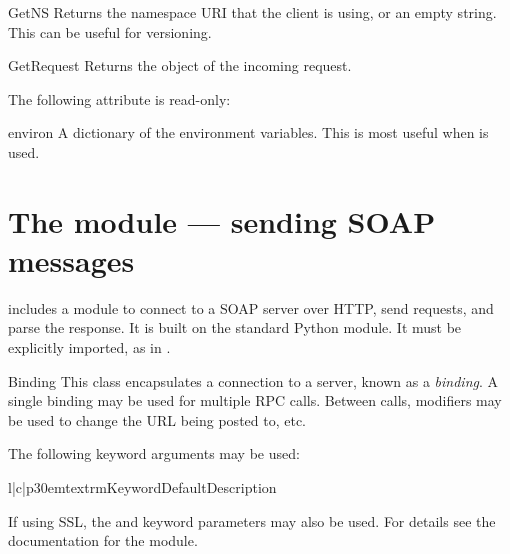 \begin{methoddesc}{GetNS}{}
Returns the namespace URI that the client is using, or an empty string.
This can be useful for versioning.
\end{methoddesc}

\begin{methoddesc}{GetRequest}{}
Returns the  object of the incoming request.
\end{methoddesc}

The following attribute is read-only:

\begin{memberdesc}{environ}
A dictionary of the environment variables.
This is most useful when  is used.
\end{memberdesc}

\section{The  module --- sending SOAP messages}

\ZSI{} includes a module to connect to a SOAP server over HTTP, send requests,
and parse the response.
It is built on the standard Python  module.
It must be explicitly imported, as in
.

\begin{classdesc}{Binding}{}
This class encapsulates a connection to a server, known as a \emph{binding}.
A single binding may be used for multiple RPC calls.
Between calls, modifiers may be used to change the URL being posted to,
etc.

The following keyword arguments may be used:

\begin{tableiii}{l|c|p{30em}}{textrm}{Keyword}{Default}{Description}
\end{tableiii}

If using SSL, the  and  keyword parameters may
also be used.
For details see the documentation for the  module.

\end{classdesc}

